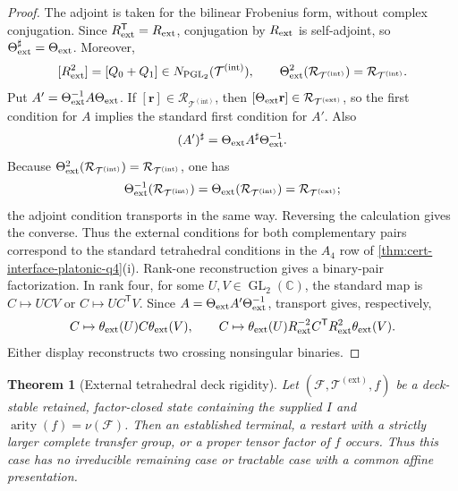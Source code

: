 \documentclass[11pt,letterpaper,onecolumn]{article}
\theoremstyle{plain}
\newtheorem{theorem}{Theorem}[section]
\theoremstyle{definition}
\theoremstyle{remark}
\newcommand{\cF}{\mathcal F}
\newcommand{\TetInt}{{\mathcal T^{(\mathrm{int})}}}
\newcommand{\TetExt}{{\mathcal T^{(\mathrm{ext})}}}
\newcommand{\PGL}{\operatorname{PGL}}
\newcommand{\GL}{\operatorname{GL}}
\newcommand{\arity}{\operatorname{arity}}
\begin{document}
\begin{proof}
The adjoint is taken for the bilinear Frobenius form, without complex
conjugation.  Since \(R_{\rm ext}^{\mathsf T}=R_{\rm ext}\), conjugation
by \(R_{\rm ext}\) is
self-adjoint, so \(\Theta_{\rm ext}^\sharp=\Theta_{\rm ext}\).  Moreover,
\[
 [R_{\rm ext}^2]=[Q_0+Q_1]\in N_{\PGL_2}(\TetInt),
 \qquad
 \Theta_{\rm ext}^2(\mathcal R_{\TetInt})
 =\mathcal R_{\TetInt}.
\]
Put \(A'=\Theta_{\rm ext}^{-1}A\Theta_{\rm ext}\).  If
\([{\mathbf{r}}]\in\mathcal R_{\TetInt}\), then
\([\Theta_{\rm ext}{\mathbf{r}}]\in\mathcal R_{\TetExt}\), so the first
condition for \(A\) implies the standard first condition for \(A'\).  Also
\[
 (A')^\sharp=\Theta_{\rm ext}A^\sharp\Theta_{\rm ext}^{-1}.
\]
Because
\(\Theta_{\rm ext}^2(\mathcal R_{\TetInt})
=\mathcal R_{\TetInt}\), one has
\[
 \Theta_{\rm ext}^{-1}(\mathcal R_{\TetInt})
 =\Theta_{\rm ext}(\mathcal R_{\TetInt})
 =\mathcal R_{\TetExt};
\]
the adjoint condition transports in the same way.
Reversing the calculation gives the converse. Thus the external
conditions for both complementary pairs correspond to the standard
tetrahedral conditions in the \(A_4\) row of
\cref{thm:cert-interface-platonic-q4}\textnormal{(i)}.  Rank-one reconstruction gives a
binary-pair factorization.  In rank four, for some
\(U,V\in\GL_2(\mathbb C)\), the standard map is \(C\mapsto UCV\) or
\(C\mapsto UC^{\mathsf T}V\).  Since
\(A=\Theta_{\rm ext}A'\Theta_{\rm ext}^{-1}\), transport gives,
respectively,
\[
 C\mapsto\theta_{\rm ext}(U)C\theta_{\rm ext}(V),
 \qquad
 C\mapsto\theta_{\rm ext}(U)R_{\rm ext}^{-2}C^{\mathsf T}
 R_{\rm ext}^2\theta_{\rm ext}(V).
\]
Either display reconstructs two crossing nonsingular binaries.
\end{proof}

\begin{theorem}[External tetrahedral deck rigidity]
\label{thm:external-a4-deck-rigidity}
Let \((\cF,\TetExt,f)\) be a deck-stable retained,
factor-closed state containing the supplied \(I\) and
\(\arity(f)=\nu(\cF)\).  Then an established terminal, a
restart with a strictly larger complete transfer group, or a proper tensor factor of \(f\) occurs.
Thus this case has no irreducible remaining case or tractable case with a common affine presentation.
\end{theorem}
\end{document}
